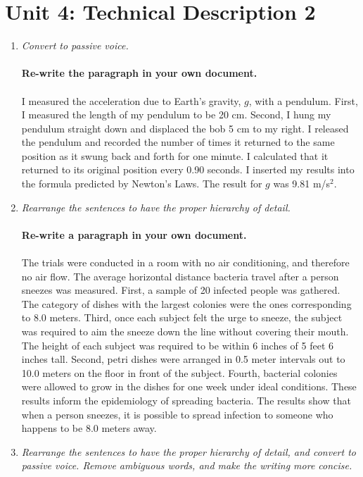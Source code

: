 \documentclass{article}
\begin{document}
\section{Unit 4: Technical Description 2}

\begin{enumerate}
\item \textit{Convert to passive voice.} \\ \\
\textbf{Re-write the paragraph in your own document.} \\ \\
I measured the acceleration due to Earth's gravity, $g$, with a pendulum.  First, I measured the length of my pendulum to be 20 cm.  Second, I hung my pendulum straight down and displaced the bob 5 cm to my right.  I released the pendulum and recorded the number of times it returned to the same position as it swung back and forth for one minute.  I calculated that it returned to its original position every 0.90 seconds.  I inserted my results into the formula predicted by Newton's Laws.  The result for $g$ was 9.81 m/s$^2$.
\item \textit{Rearrange the sentences to have the proper hierarchy of detail.} \\ \\
\textbf{Re-write a paragraph in your own document.} \\ \\
The trials were conducted in a room with no air conditioning, and therefore no air flow.  The average horizontal distance bacteria travel after a person sneezes was measured.  First, a sample of 20 infected people was gathered.  The category of dishes with the largest colonies were the ones corresponding to 8.0 meters.  Third, once each subject felt the urge to sneeze, the subject was required to aim the sneeze down the line without covering their mouth.  The height of each subject was required to be within 6 inches of 5 feet 6 inches tall.  Second, petri dishes were arranged in 0.5 meter intervals out to 10.0 meters on the floor in front of the subject.  Fourth, bacterial colonies were allowed to grow in the dishes for one week under ideal conditions.  These results inform the epidemiology of spreading bacteria. The results show that when a person sneezes, it is possible to spread infection to someone who happens to be 8.0 meters away.
\item \textit{Rearrange the sentences to have the proper hierarchy of detail, and convert to passive voice.  Remove ambiguous words, and make the writing more concise.} \\ \\

\end{enumerate}
\end{document}
